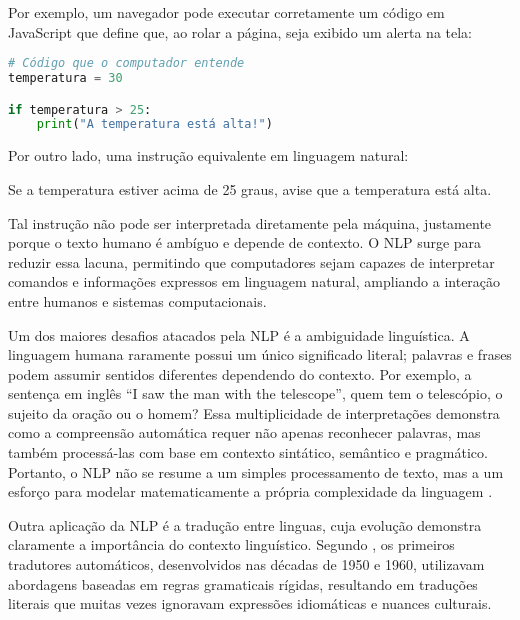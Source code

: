 Por exemplo, um navegador pode executar corretamente um código em JavaScript que define que, ao rolar a página, seja exibido um alerta na tela:
\begin{lstlisting}[language=Python, style=input]
# Código que o computador entende
temperatura = 30

if temperatura > 25:
    print("A temperatura está alta!")
\end{lstlisting}

\noindent Por outro lado, uma instrução equivalente em linguagem natural:
\begin{tcolorbox}[
  colback=yellow!20, 
  colframe=black,
  width=0.8\linewidth,   %
  left=0pt,               %
  boxsep=2mm,
  enlarge left by=0.1\linewidth  %
]
Se a temperatura estiver acima de 25 graus, avise que a temperatura está alta.
\end{tcolorbox}
Tal instrução não pode ser interpretada diretamente pela máquina, justamente porque o texto humano é ambíguo e depende de contexto. 
O NLP surge para reduzir essa lacuna, permitindo que computadores sejam capazes de interpretar comandos e informações expressos em linguagem natural, ampliando a interação entre humanos e sistemas computacionais.


Um dos maiores desafios atacados pela NLP é a ambiguidade linguística. A linguagem humana raramente possui um único significado literal; palavras e frases podem assumir sentidos diferentes dependendo do contexto. Por exemplo, a sentença em inglês “I saw the man with the telescope”, quem tem o telescópio, o sujeito da oração ou o homem? Essa multiplicidade de interpretações demonstra como a compreensão automática requer não apenas reconhecer palavras, mas também processá-las com base em contexto sintático, semântico e pragmático. Portanto, o NLP não se resume a um simples processamento de texto, mas a um esforço para modelar matematicamente a própria complexidade da linguagem \cite{jurafsky2023speech}.


Outra aplicação da NLP é a tradução entre linguas, cuja evolução demonstra claramente a importância do contexto linguístico. Segundo \textcite{hutchins2005history}, os primeiros tradutores automáticos, desenvolvidos nas décadas de 1950 e 1960, utilizavam abordagens baseadas em regras gramaticais rígidas, resultando em traduções literais que muitas vezes ignoravam expressões idiomáticas e nuances culturais.

